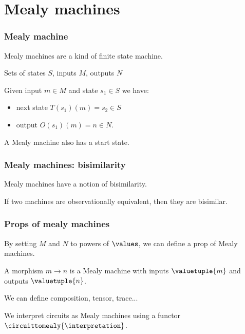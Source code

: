 \section{Mealy machines}

\begin{frame}
    \frametitle{Mealy machine}

    Mealy machines are a kind of \alert{finite state machine}.

    \pause

    Sets of \alert{states} \(S\), \pause \alert{inputs} \(M\), \pause \alert{outputs} \(N\)

    \pause

    Given input \(m \in M\) and state \(s_1 \in S\) we have:
    
    \pause

    \begin{itemize}
        \item \alert{next state} \(T(s_1)(m) = s_2 \in S\)
        \pause
        \item \alert{output} \(O(s_1)(m) = n \in N\).
    \end{itemize}

    \pause

    A Mealy machine also has a \alert{start state}.

    \pause

    \begin{center}
        
    \end{center}

\end{frame}

\begin{frame}
    \frametitle{Mealy machines: bisimilarity}

    Mealy machines have a notion of \alert{bisimilarity}.

    \pause

    If two machines are \alert{observationally equivalent}, then they are bisimilar.

\end{frame}

\begin{frame}
    \frametitle{Props of mealy machines}

    By setting \(M\) and \(N\) to powers of \(\values\), we can define a prop of Mealy machines.

    \pause

    A morphism \(m \to n\) is a Mealy machine with inputs \(\valuetuple{m}\) and outputs \(\valuetuple{n}\).
    
    \pause

    We can define composition, tensor, trace...

    \pause

    We interpret circuits as Mealy machines using a functor $\circuittomealy{\interpretation}$.

\end{frame}

